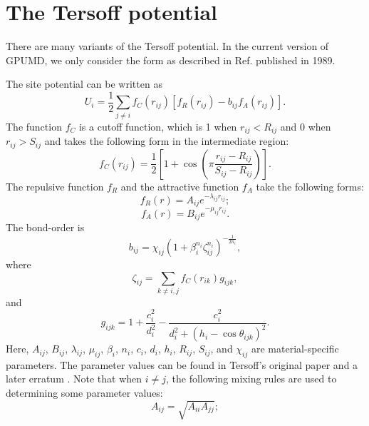 \documentclass[12pt,a4paper]{report}
\begin{document}
\section{The Tersoff potential}

There are many variants of the Tersoff potential. In the current version of GPUMD, we only consider the form as described in Ref. \cite{tersoff1989prb} published in 1989.

The site potential can be written as
\begin{equation}
U_i =  \frac{1}{2} \sum_{j \neq i} f_C(r_{ij}) \left[ f_R(r_{ij}) - b_{ij} f_A(r_{ij}) \right].
\end{equation}
The function $f_{C}$ is a cutoff function, which is 1 when $r_{ij}<R_{ij}$ and 0 when  $r_{ij}>S_{ij}$ and takes the following form in the intermediate region:
\begin{equation}
f_{C}(r_{ij}) = \frac{1}{2}
\left[
1 + \cos \left( \pi \frac{r_{ij} - R_{ij}}{S_{ij} - R_{ij}} \right)
\right].
\end{equation}
The repulsive function $f_{R}$ and the attractive function $f_{A}$ take the following forms:
\begin{equation}
f_{R}(r) = A_{ij} e^{-\lambda_{ij} r_{ij}};
\end{equation}
\begin{equation}
f_{A}(r) = B_{ij} e^{-\mu_{ij} r_{ij}}.
\end{equation}
The bond-order is
\begin{equation}
\label{equation:bij}
b_{ij} = \chi_{ij} \left(1 + \beta_i^{n_i} \zeta^{n_i}_{ij}\right)^{-\frac{1}{2n_i}},
\end{equation}
where
\begin{equation}
\zeta_{ij} = \sum_{k\neq i, j}f_C(r_{ik}) g_{ijk},
\end{equation}
and
\begin{equation}
g_{ijk} = 1 + \frac{c_i^2}{d_i^2} - \frac{c_i^2}{d_i^2+(h_i-\cos\theta_{ijk})^2}.
\end{equation}
Here, $A_{ij}$, $B_{ij}$, $\lambda_{ij}$, $\mu_{ij}$, $\beta_i$, $n_i$, $c_i$, $d_i$, $h_i$, $R_{ij}$, $S_{ij}$, and $\chi_{ij}$ are material-specific parameters. The parameter values can be found in Tersoff's original paper \cite{tersoff1989prb} and a later erratum \cite{tersoff1990prb}. Note that when $i \neq j$, the following mixing rules are used to determining some parameter values:
\begin{equation}
A_{ij} =  \sqrt{A_{ii} A_{jj}};
\end{equation}
\end{document}

